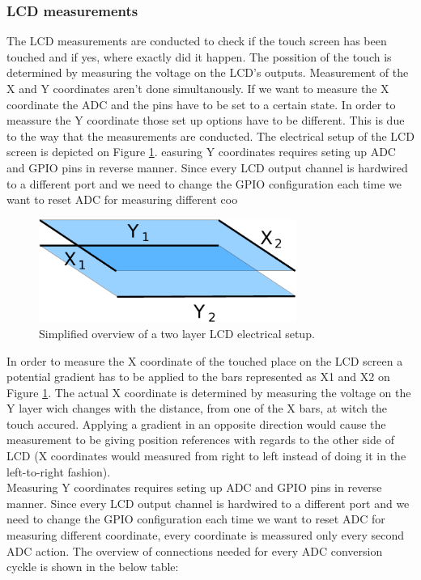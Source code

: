 \subsubsection{LCD measurements}
The LCD measurements are conducted to check if the touch screen has been touched and if yes, where exactly did it happen. The possition of the touch is determined by measuring the voltage on the LCD's outputs. Measurement of the X and Y coordinates aren't done simultanously. If we want to measure the X coordinate the ADC and the pins have to be set to a certain state. In order to meassure the Y coordinate those set up options have to be different. This is due to the way that the measurements are conducted. The electrical setup of the LCD screen is depicted on Figure \ref{fig:LCD_screen_measurement}.
easuring Y coordinates requires seting up ADC and GPIO pins in reverse manner. Since every LCD output channel is hardwired to a different port and we need to change the GPIO configuration each time we want to reset ADC for measuring different coo
\begin{figure}
  \centering
  \includegraphics[width=0.75\textwidth]{img/used/adc_layers.pdf}               
  \caption{Simplified overview of a two layer LCD electrical setup.}
  \label{fig:LCD_screen_measurement}
\end{figure}

In order to measure the X coordinate of the touched place on the LCD screen a potential gradient has to be applied to the bars represented as X1 and X2 on Figure \ref{fig:LCD_screen_measurement}. The actual X coordinate is determined by measuring the voltage on the Y layer wich changes with the distance, from one of the X bars, at witch the touch accured. Applying a gradient in an opposite direction would cause the measurement to be giving position references with regards to the other side of LCD (X coordinates would measured from right to left instead of doing it in the left-to-right fashion). \\
Measuring Y coordinates requires seting up ADC and GPIO pins in reverse manner. Since every LCD output channel is hardwired to a different port and we need to change the GPIO configuration each time we want to reset ADC for measuring different coordinate, every coordinate is meassured only every second ADC action. The overview of connections needed for every ADC conversion cyckle is shown in the below table:


